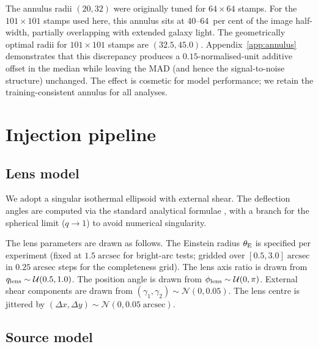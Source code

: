\documentclass[fleqn,usenatbib]{rasti}
\begin{document}
The annulus radii $(20, 32)$ were originally tuned for $64 \times 64$ stamps.  For the $101 \times 101$ stamps used here, this annulus sits at $40$--$64$~per cent of the image half-width, partially overlapping with extended galaxy light.  The geometrically optimal radii for $101 \times 101$ stamps are $(32.5, 45.0)$.  Appendix~\ref{app:annulus} demonstrates that this discrepancy produces a $0.15$-normalised-unit additive offset in the median while leaving the MAD (and hence the signal-to-noise structure) unchanged.  The effect is cosmetic for model performance; we retain the training-consistent annulus for all analyses.


\section{Injection pipeline}

\subsection{Lens model}

We adopt a singular isothermal ellipsoid \citep[SIE;][]{Kormann1994} with external shear.  The deflection angles are computed via the standard analytical formulae \citep{Keeton2001}, with a branch for the spherical limit ($q \to 1$) to avoid numerical singularity.

The lens parameters are drawn as follows.  The Einstein radius $\theta_{\rm E}$ is specified per experiment (fixed at $1.5\;\mathrm{arcsec}$ for bright-arc tests; gridded over $[0.5, 3.0]\;\mathrm{arcsec}$ in $0.25\;\mathrm{arcsec}$ steps for the completeness grid).  The lens axis ratio is drawn from $q_{\rm lens} \sim \mathcal{U}(0.5, 1.0)$.  The position angle is drawn from $\phi_{\rm lens} \sim \mathcal{U}(0, \pi)$.  External shear components are drawn from $(\gamma_1, \gamma_2) \sim \mathcal{N}(0, 0.05)$.  The lens centre is jittered by $(\Delta x, \Delta y) \sim \mathcal{N}(0, 0.05\;\mathrm{arcsec})$.

\subsection{Source model}
\end{document}
